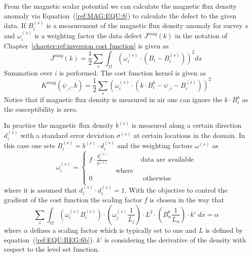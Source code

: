 From the magnetic scalar potential we can calculate the magnetic flux density
anomaly via Equation~(\ref{ref:MAG:EQU:8}) to calculate the defect to the given
data.
If $B^{(s)}_i$ is a measurement of the magnetic flux density anomaly for
survey $s$ and $\omega^{(s)}_i$ is a weighting factor the data defect
$J^{mag}(k)$ in the notation of Chapter~\ref{chapter:ref:inversion cost function} is given as
\begin{equation}\label{ref:MAG:EQU:9}
J^{mag}(k) = \frac{1}{2}\sum_{s} \int_{\Omega} ( \omega^{(s)}_i \cdot (B_{i}- B^{(s)}_i) ) ^2 dx
\end{equation} 
Summation over $i$ is performed.
The cost function kernel is given as
\begin{equation}\label{ref:MAG:EQU:10}
K^{mag}(\psi_{,i},k) = \frac{1}{2}\sum_{s} ( \omega^{(s)}_i \cdot (k \cdot B^b_i - \psi_{,i} - B^{(s)}_i) ) ^2
\end{equation} 
Notice that if magnetic flux density is measured in air one can ignore the
$k\cdot B^b_i$ as the susceptibility is zero.

In practice the magnetic flux density $b^{(s)}$ is measured along a certain
direction $d^{(s)}_i$ with a standard error deviation $\sigma^{(s)}$ at
certain locations in the domain.
In this case one sets $B^{(s)}_i=b^{(s)} \cdot d^{(s)}_i$ and the weighting
factors $\omega^{(s)}$ as
\begin{equation}\label{ref:MAG:EQU:11}
\omega^{(s)}_i 
= \left\{
\begin{array}{lcl}
f \cdot  \frac{d^{(s)}_i}{\sigma^{(s)}} & & \mbox{data are available} \\
& \mbox{ where } & \\
0 & & \mbox{ otherwise } \\
\end{array}
\right.
\end{equation} 
where it is assumed that $d^{(s)}_i \cdot d^{(s)}_i =1$. With the objective to control the 
gradient of the cost function the scaling factor $f$ is chosen in the way that 
\begin{equation}\label{ref:MAG:EQU:12}
\sum_{s} \int_{\Omega} ( \omega^{(s)}_i B^{(s)}_i ) 
 \cdot ( \omega^{(s)}_j \frac{1}{L_j} ) \cdot L^2 \cdot
( B^b_n \frac{1}{L_n} )
 \cdot k' \;
 dx =\alpha
\end{equation} 
where $\alpha$ defines a scaling factor which is typically set to one and $L$ is defined by equation~(\ref{ref:EQU:REG:6b}).
$k'$ is considering the 
derivative of the density with respect to the level set function. 


